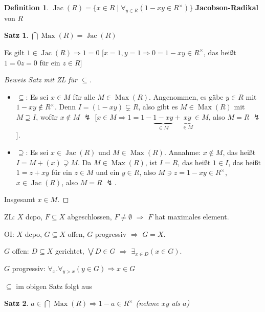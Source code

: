 \documentclass[headsepline=true,DIV=11]{scrartcl}
\newtheorem*{theorem}{Satz}
\theoremstyle{definition}
\newtheorem*{definition}{Definition}
\newenvironment{gelaber}{}{}
\newcommand{\Max}{\operatorname{Max}}
\newcommand{\Jac}{\operatorname{Jac}}
\begin{document}
\begin{definition}
  $\Jac(R) = \{x\in R\mid \forall_{y\in R} (1-xy\in R^\times)\}$ {\bf Jacobson-Radikal} von $R$
\end{definition}

\begin{theorem}
  $\bigcap\Max(R)=\Jac(R)$
\end{theorem}

Es gilt $1\in\Jac(R)\Rightarrow 1=0$ [$x=1,y=1\Rightarrow 0=1-xy\in R^\times$, das heißt $1=0z=0$ für ein $z\in R$]

\begin{proof}[Beweis Satz mit ZL für $\subseteq$]
  $\phantom{a}$

  \begin{itemize}
    \item $\subseteq$: Es sei $x\in M$ für alle $M\in\Max(R)$. Angenommen, es gäbe $y\in R$ mit $1-xy\not\in R^\times$. Denn $I=(1-xy)\subsetneq R$,
      also gibt es $M\in\Max(R)$ mit $M\supseteq I$, wofür $x\not\in M$ $\lightning$ [$x\in M\Rightarrow 1=1-\underbrace{1-xy}_{\in
          M}+\underbrace{xy}_{\in M}\in M$, also $M=R$ $\lightning$].
    \item $\supseteq$: Es sei $x\in\Jac(R)$ und $M\in\Max(R)$. Annahme: $x\not\in M$, das heißt $I=M+(x)\supsetneq M$. Da $M\in\Max(R)$, ist $I=R$,
      das heißt $1\in I$, das heißt $1=z+xy$ für ein $z\in M$ und ein $y\in R$, also $M\ni z=1-xy\in R^\times$, $x\in\Jac(R)$, also $M=R$
      $\lightning$.
  \end{itemize}
  Insgesamt $x\in M$.
\end{proof}

\begin{gelaber}
  ZL: $X$ dcpo, $F\subseteq X$ abgeschlossen, $F\neq\emptyset$ $\Rightarrow$ $F$ hat maximales element.
\end{gelaber}

\begin{gelaber}
  OI: $X$ dcpo, $G\subseteq X$ offen, $G$ progressiv $\Rightarrow$ $G=X$.

  $G$ offen: $D\subseteq X$ gerichtet, $\bigvee D\in G$ $\Rightarrow$
  $\exists_{x\in D}(x\in G)$.

  $G$ progressiv: $\forall_x . \forall_{y>x}(y\in G) \Rightarrow x\in G$
\end{gelaber}

$\subseteq$ im obigen Satz folgt aus

\begin{theorem}
  $a\in\bigcap\Max(R)\Rightarrow 1-a\in R^\times$ (nehme $xy$ als $a$)
\end{theorem}
\end{document}
